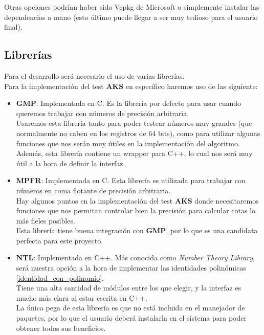 Otras opciones podrían haber sido Vcpkg de Microsoft o simplemente instalar las dependencias a mano (esto último puede llegar a ser muy tedioso para el usuario final).

\subsection{Librerías}

Para el desarrollo será necesario el uso de varias librerías.\\

Para la implementación del test \textbf{AKS} en específico haremos uso de las siguiente:

\begin{itemize}
	\item \textbf{GMP}: Implementada en C. Es la librería por defecto para usar cuando queremos trabajar con números de precisión arbitraria.\\
	
	Usaremos esta librería tanto para poder testear números muy grandes (que normalmente no caben en los registros de 64 bits), como para utilizar algunas funciones que nos serán muy útiles en la implementación del algoritmo.\\
	
	Además, esta librería contiene un wrapper para C++, lo cual nos será muy útil a la hora de definir la interfaz.\\
	
	\item \textbf{MPFR}: Implementada en C. Esta librería es utilizada para trabajar con números en coma flotante de precisión arbitraria.\\
	
	Hay algunos puntos en la implementación del test \textbf{AKS} donde necesitaremos funciones que nos permitan controlar bien la precisión para calcular cotas lo más fieles posibles.\\
	
	Esta librería tiene buena integración con \textbf{GMP}, por lo que es una candidata perfecta para este proyecto.
	
	\item \textbf{NTL}: Implementada en C++. Más conocida como \textit{Number Theory Library}, será nuestra opción a la hora de implementar las identidades polinómicas \eqref{identidad_con_polinomio}.\\
	
	Tiene una alta cantidad de módulos entre los que elegir, y la interfaz es mucho más clara al estar escrita en C++.\\
	
	La única pega de esta librería es que no está incluida en el manejador de paquetes, por lo que el usuario deberá instalarla en el sistema para poder obtener todos sus beneficios.
\end{itemize}

